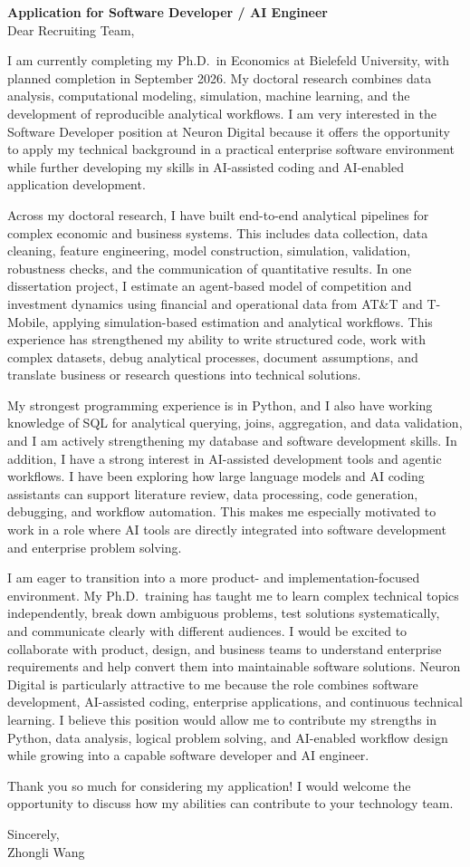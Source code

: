 \documentclass[11pt]{article}
\begin{document}
\vspace{0.1cm}

\noindent
\textbf{Application for Software Developer / AI Engineer} \\

\noindent Dear Recruiting Team,

I am currently completing my Ph.D.\ in Economics at Bielefeld University, with planned completion in September 2026. My doctoral research combines data analysis, computational modeling, simulation, machine learning, and the development of reproducible analytical workflows. I am very interested in the Software Developer position at Neuron Digital because it offers the opportunity to apply my technical background in a practical enterprise software environment while further developing my skills in AI-assisted coding and AI-enabled application development.

Across my doctoral research, I have built end-to-end analytical pipelines for complex economic and business systems. This includes data collection, data cleaning, feature engineering, model construction, simulation, validation, robustness checks, and the communication of quantitative results. In one dissertation project, I estimate an agent-based model of competition and investment dynamics using financial and operational data from AT\&T and T-Mobile, applying simulation-based estimation and analytical workflows. This experience has strengthened my ability to write structured code, work with complex datasets, debug analytical processes, document assumptions, and translate business or research questions into technical solutions.

My strongest programming experience is in Python, and I also have working knowledge of SQL for analytical querying, joins, aggregation, and data validation, and I am actively strengthening my database and software development skills. In addition, I have a strong interest in AI-assisted development tools and agentic workflows. I have been exploring how large language models and AI coding assistants can support literature review, data processing, code generation, debugging, and workflow automation. This makes me especially motivated to work in a role where AI tools are directly integrated into software development and enterprise problem solving.

I am eager to transition into a more product- and implementation-focused environment. My Ph.D.\ training has taught me to learn complex technical topics independently, break down ambiguous problems, test solutions systematically, and communicate clearly with different audiences. I would be excited to collaborate with product, design, and business teams to understand enterprise requirements and help convert them into maintainable software solutions. 
Neuron Digital is particularly attractive to me because the role combines software development, AI-assisted coding, enterprise applications, and continuous technical learning. I believe this position would allow me to contribute my strengths in Python, data analysis, logical problem solving, and AI-enabled workflow design while growing into a capable software developer and AI engineer.

Thank you so much for considering my application! I would welcome the opportunity to discuss how my abilities can contribute to your technology team.

\vspace{0.15cm}

\noindent Sincerely, \\[0.1cm]
\noindent Zhongli Wang
\end{document}
